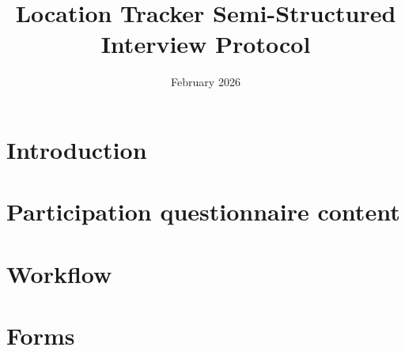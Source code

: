 \documentclass[11pt]{article}
\begin{document}
\title{Location Tracker Semi-Structured Interview Protocol}
\author{}
\date{February 2026}

\maketitle
\section{Introduction}

\section{Participation questionnaire content}

\section{Workflow}

\section{Forms}

\end{document}
